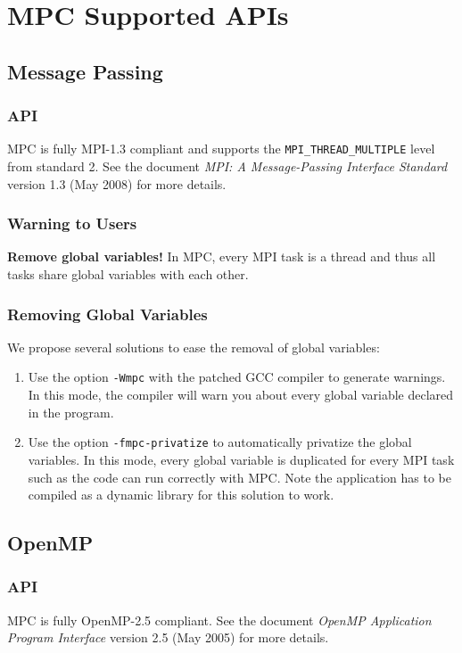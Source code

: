 \documentclass[a4paper,11pt]{article}
\begin{document}
\section{MPC Supported APIs}
\label{sec:APIs}

\subsection{Message Passing}

\subsubsection{API}
MPC is fully MPI-1.3 compliant and supports the \texttt{MPI\_THREAD\_MULTIPLE} level from standard 2.
See the document \emph{MPI: A Message-Passing Interface Standard} version 1.3
(May 2008) for more details.

\subsubsection{Warning to Users}
\textbf{Remove global variables!}
In MPC, every MPI task is a thread and thus all tasks share global variables
with each other.

\subsubsection{Removing Global Variables}
We propose several solutions to ease the removal of global variables:
\begin{enumerate}
\item Use the option \texttt{-Wmpc} with the patched GCC compiler to generate warnings.
In this mode, the compiler will warn you about every global variable declared in the program.
\item Use the option \texttt{-fmpc-privatize} to automatically privatize the global variables.
In this mode, every global variable is duplicated for every MPI task such as the code can run correctly with MPC.
Note the application has to be compiled as a dynamic library for this solution to work.
\end{enumerate}


\subsection{OpenMP}

\subsubsection{API}
MPC is fully OpenMP-2.5 compliant.
See the document \emph{OpenMP Application Program Interface} version 2.5
(May 2005) for more details.
\end{document}
